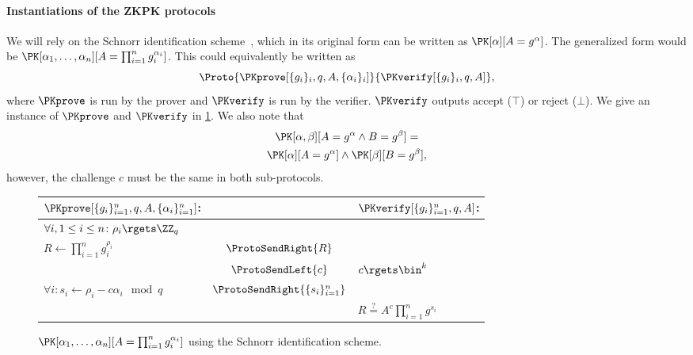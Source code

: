 \paragraph*{Instantiations of the \acs{ZKPK} protocols}

We will rely on the Schnorr identification scheme~\cite{Schnorr}, which in its 
original form can be written as \(\PK[\alpha][A = g^\alpha]\).
The generalized form would be \(\PK[\alpha_1, \dotsc, \alpha_n][A = 
    \prod_{i=1}^n g_i^{\alpha_i}]\).
This could equivalently be written as
\begin{equation*}
  \Proto%
  {\PKprove[\{g_i\}_i, q, A, \{\alpha_i\}_i]}%
  {\PKverify[\{g_i\}_i, q, A]},
\end{equation*}
where \(\PKprove\) is run by the prover and \(\PKverify\) is run by the 
verifier.
\(\PKverify\) outputs accept (\(\top\)) or reject (\(\bot\)).
We give an instance of \(\PKprove\) and \(\PKverify\) in \cref{PKalgorithms}.
We also note that
\begin{multline*}
  \PK[\alpha, \beta][A = g^\alpha \land B = g^\beta] = \\
  \PK[\alpha][A = g^\alpha] \land \PK[\beta][B = g^\beta],
\end{multline*}
however, the challenge \(c\) must be the same in both sub-protocols.

\begin{figure*}
  \small
  \begin{tabular}{lcl}
    \(\PKprove[\{g_i\}_{i=1}^n, q, A, \{\alpha_i\}_{i=1}^n]\):
    &
    & \(\PKverify[\{g_i\}_{i=1}^n, q, A]\):
    \\
    \midrule

    \(\forall i, 1\leq i\leq n\colon \rho_i\rgets \ZZ_q\)
    &
    &
    \\

    \(R\gets \prod_{i=1}^n g_i^{\rho_i}\)
    & \(\ProtoSendRight{R}\)
    &
    \\

    & \(\ProtoSendLeft{c}\)
    & \(c\rgets \bin^k\)
    \\

    \(\forall i\colon s_i\gets \rho_i - c\alpha_i \mod q\)
    & \(\ProtoSendRight{\{s_i\}_{i=1}^n}\)
    &
    \\

    &
    & \(R \stackrel{?}{=} A^c \prod_{i=1}^n g^{s_i}\)
    \\
    
  \end{tabular}
  \caption{%
    \(\PK[\alpha_1, \dotsc, \alpha_n][A = \prod_{i=1}^n g_i^{\alpha_i}]\) using 
    the Schnorr identification scheme.
  }%
  \label{PKalgorithms}
\end{figure*}

